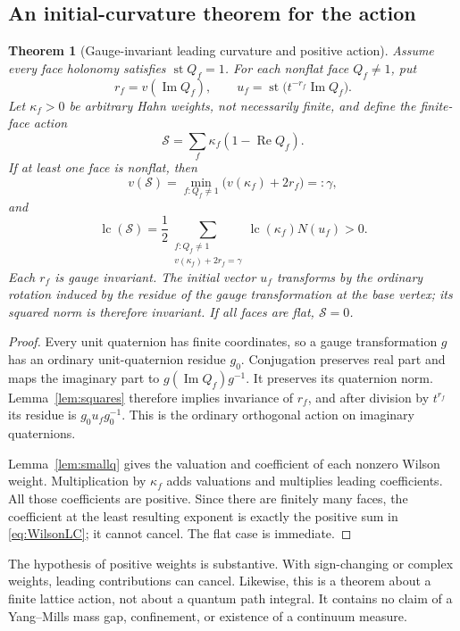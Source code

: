 \documentclass[11pt,oneside]{article}
\numberwithin{equation}{section}
\theoremstyle{plain}
\newtheorem{theorem}{Theorem}[section]
\theoremstyle{definition}
\theoremstyle{remark}
\newcommand{\st}{\operatorname{st}}
\newcommand{\Rea}{\operatorname{Re}}
\newcommand{\Ima}{\operatorname{Im}}
\newcommand{\lc}{\operatorname{lc}}
\begin{document}
\subsection{An initial-curvature theorem for the action}
\begin{theorem}[Gauge-invariant leading curvature and positive action]\label{thm:wilson}
Assume every face holonomy satisfies $\st Q_f=1$. For each nonflat face $Q_f\ne1$, put
\[
 r_f=v(\Ima Q_f),\qquad
 u_f=\st\bigl(t^{-r_f}\Ima Q_f\bigr).
\]
Let $\kappa_f>0$ be arbitrary Hahn weights, not necessarily finite, and define the finite-face action
\[
 \mathcal S=\sum_f\kappa_f(1-\Rea Q_f).
\]
If at least one face is nonflat, then
\begin{equation}\label{eq:WilsonVal}
 v(\mathcal S)=\min_{f:Q_f\ne1}\bigl(v(\kappa_f)+2r_f\bigr)=:\gamma,
\end{equation}
and
\begin{equation}\label{eq:WilsonLC}
 \lc(\mathcal S)=
 \frac12\sum_{\substack{f:Q_f\ne1\\v(\kappa_f)+2r_f=\gamma}}
 \lc(\kappa_f)N(u_f)>0.
\end{equation}
Each $r_f$ is gauge invariant. The initial vector $u_f$ transforms by the ordinary rotation induced by the residue of the gauge transformation at the base vertex; its squared norm is therefore invariant. If all faces are flat, $\mathcal S=0$.
\end{theorem}
\begin{proof}
Every unit quaternion has finite coordinates, so a gauge transformation $g$ has an ordinary unit-quaternion residue $g_0$. Conjugation preserves real part and maps the imaginary part to $g(\Ima Q_f)g^{-1}$. It preserves its quaternion norm. Lemma~\ref{lem:squares} therefore implies invariance of $r_f$, and after division by $t^{r_f}$ its residue is $g_0u_fg_0^{-1}$. This is the ordinary orthogonal action on imaginary quaternions.

Lemma~\ref{lem:smallq} gives the valuation and coefficient of each nonzero Wilson weight. Multiplication by $\kappa_f$ adds valuations and multiplies leading coefficients. All those coefficients are positive. Since there are finitely many faces, the coefficient at the least resulting exponent is exactly the positive sum in \eqref{eq:WilsonLC}; it cannot cancel. The flat case is immediate.
\end{proof}

The hypothesis of positive weights is substantive. With sign-changing or complex weights, leading contributions can cancel. Likewise, this is a theorem about a finite lattice action, not about a quantum path integral. It contains no claim of a Yang--Mills mass gap, confinement, or existence of a continuum measure.
\end{document}
